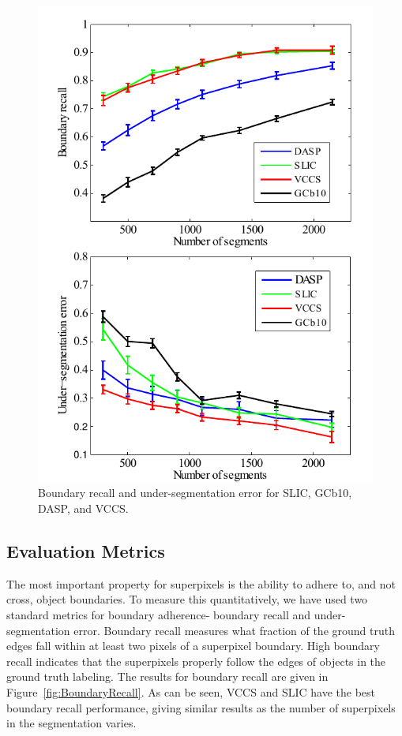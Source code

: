 \begin{figure}[t]
\begin{center}
\includegraphics[width=0.95\linewidth]{figures/CVPR2013/Performance.pdf}
\end{center}
   \caption[Boundary Recall \& Undersegmentation Error]{Boundary recall and under-segmentation error for SLIC, GCb10, DASP, and VCCS.}
\label{fig:BoundaryRecall}
\label{fig:UndersegError}
\end{figure}

\subsection{Evaluation Metrics}
The most important property for superpixels is the ability to adhere to, and not cross, object boundaries. To measure this quantitatively, we have used two standard metrics for boundary adherence- boundary recall and under-segmentation error\cite{Turbopixels, SuperpixelsSupervoxels}. Boundary recall measures what fraction of the ground truth edges fall within at least two pixels of a superpixel boundary. High boundary recall indicates that the superpixels properly follow the edges of objects in the ground truth labeling. The results for boundary recall are given in Figure~\ref{fig:BoundaryRecall}. As can be seen, VCCS and SLIC have the best boundary recall performance, giving similar results as the number of superpixels in the segmentation varies. 

